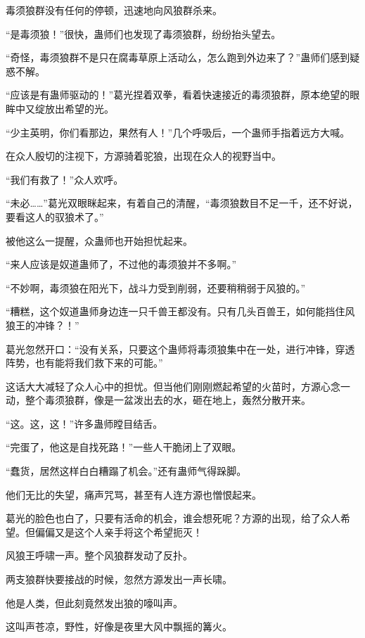 
\begin{this_body}

毒须狼群没有任何的停顿，迅速地向风狼群杀来。

“是毒须狼！”很快，蛊师们也发现了毒须狼群，纷纷抬头望去。

“奇怪，毒须狼群不是只在腐毒草原上活动么，怎么跑到外边来了？”蛊师们感到疑惑不解。

“应该是有蛊师驱动的！”葛光捏着双拳，看着快速接近的毒须狼群，原本绝望的眼眸中又绽放出希望的光。

“少主英明，你们看那边，果然有人！”几个呼吸后，一个蛊师手指着远方大喊。

在众人殷切的注视下，方源骑着驼狼，出现在众人的视野当中。

“我们有救了！”众人欢呼。

“未必……”葛光双眼眯起来，有着自己的清醒，“毒须狼数目不足一千，还不好说，要看这人的驭狼术了。”

被他这么一提醒，众蛊师也开始担忧起来。

“来人应该是奴道蛊师了，不过他的毒须狼并不多啊。”

“不妙啊，毒须狼在阳光下，战斗力受到削弱，还要稍稍弱于风狼的。”

“糟糕，这个奴道蛊师身边连一只千兽王都没有。只有几头百兽王，如何能挡住风狼王的冲锋？！”

葛光忽然开口：“没有关系，只要这个蛊师将毒须狼集中在一处，进行冲锋，穿透阵势，也有能将我们救下来的可能。”

这话大大减轻了众人心中的担忧。但当他们刚刚燃起希望的火苗时，方源心念一动，整个毒须狼群，像是一盆泼出去的水，砸在地上，轰然分散开来。

“这。这，这！”许多蛊师瞠目结舌。

“完蛋了，他这是自找死路！”一些人干脆闭上了双眼。

“蠢货，居然这样白白糟蹋了机会。”还有蛊师气得跺脚。

他们无比的失望，痛声咒骂，甚至有人连方源也憎恨起来。

葛光的脸色也白了，只要有活命的机会，谁会想死呢？方源的出现，给了众人希望。但偏偏又是这个人亲手将这个希望扼灭！

风狼王呼啸一声。整个风狼群发动了反扑。

两支狼群快要接战的时候，忽然方源发出一声长啸。

他是人类，但此刻竟然发出狼的嚎叫声。

这叫声苍凉，野性，好像是夜里大风中飘摇的篝火。


\end{this_body}
